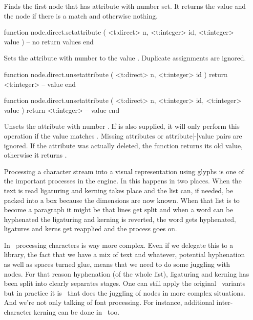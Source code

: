 Finds the first node that has attribute with number  set. It returns
the value and the node if there is a match and otherwise nothing.

\starttyping[option=LUA]
function node.direct.setattribute ( <t:direct> n, <t:integer> id, <t:integer> value )
    -- no return values
end
\stoptyping

Sets the attribute with number  to the value . Duplicate
assignments are ignored.

\starttyping[option=LUA]
function node.direct.unsetattribute ( <t:direct> n, <t:integer> id )
    return <t:integer> -- value
end

function node.direct.unsetattribute ( <t:direct> n, <t:integer> id, <t:integer> value )
    return <t:integer> -- value
end
\stoptyping

Unsets the attribute with number . If  is also supplied,
it will only perform this operation if the value matches . Missing
attributes or attribute|-|value pairs are ignored. If the attribute was actually
deleted, the function returns its old value, otherwise it returns .

\stopsubsection

\startsubsection[title={Glyph handling}]

Processing a character stream into a visual representation using glyphs is one of
the important processes in the engine. In  this happens in two places. When
the text is read ligaturing and kerning takes place and the list can, if needed,
be packed into a box because the dimensions are now known. When that list is to
become a paragraph it might be that lines get split and when a word can be
hyphenated the ligaturing and kerning is reverted, the word gets hyphenated,
ligatures and kerns get reapplied and the process goes on.

In \OPENTYPE\ processing characters is way more complex. Even if we delegate this
to a library, the fact that we have a mix of text and whatever, potential
hyphenation as well as spaces turned glue, means that we need to do some juggling
with nodes. For that reason hyphenation (of the whole list), ligaturing and
kerning has been split into clearly separates stages. One can still apply the
original \TEX\ variants but in practice it is \LUA\ that does the juggling of
nodes in more complex situations. And we're not only talking of font processing.
For instance, additional inter-character kerning can be done in \LUA\ too.

